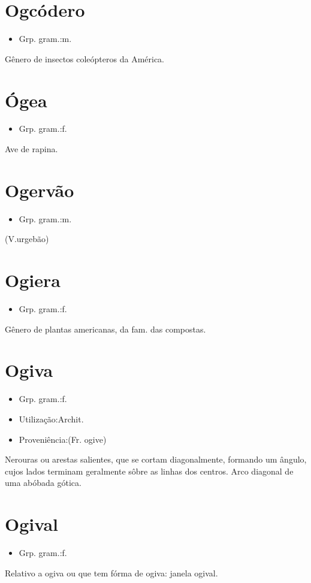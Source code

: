 \section{Ogcódero}
\begin{itemize}
\item {Grp. gram.:m.}
\end{itemize}
Gênero de insectos coleópteros da América.
\section{Ógea}
\begin{itemize}
\item {Grp. gram.:f.}
\end{itemize}
Ave de rapina.
\section{Ogervão}
\begin{itemize}
\item {Grp. gram.:m.}
\end{itemize}
(V.urgebão)
\section{Ogiera}
\begin{itemize}
\item {Grp. gram.:f.}
\end{itemize}
Gênero de plantas americanas, da fam. das compostas.
\section{Ogiva}
\begin{itemize}
\item {Grp. gram.:f.}
\end{itemize}
\begin{itemize}
\item {Utilização:Archit.}
\end{itemize}
\begin{itemize}
\item {Proveniência:(Fr. \textunderscore ogive\textunderscore )}
\end{itemize}
Nerouras ou arestas salientes, que se cortam diagonalmente, formando um ângulo, cujos lados terminam geralmente sôbre as linhas dos centros.
Arco diagonal de uma abóbada gótica.
\section{Ogival}
\begin{itemize}
\item {Grp. gram.:f.}
\end{itemize}
Relativo a ogiva ou que tem fórma de ogiva: \textunderscore janela ogival\textunderscore .
